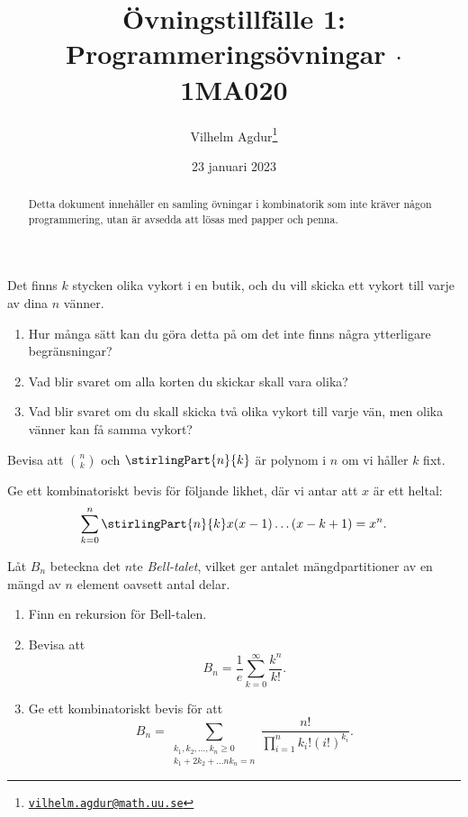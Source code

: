 \documentclass[nobib]{tufte-handout}
\title{Övningstillfälle 1: Programmeringsövningar $\cdot$ 1MA020}
\author[Vilhelm Agdur]{Vilhelm Agdur\thanks{\href{mailto:vilhelm.agdur@math.uu.se}{\nolinkurl{vilhelm.agdur@math.uu.se}}}}
\date{23 januari 2023}
\begin{document}
\maketitle%

\begin{abstract}
\noindent
Detta dokument innehåller en samling övningar i kombinatorik som inte kräver någon programmering, utan är avsedda att lösas med papper och penna.
\end{abstract}

\begin{xca}
    Det finns $k$ stycken olika vykort i en butik, och du vill skicka ett vykort till varje av dina $n$ vänner.

    \begin{enumerate}
        \item Hur många sätt kan du göra detta på om det inte finns några ytterligare begränsningar?
        \item Vad blir svaret om alla korten du skickar skall vara olika?
        \item Vad blir svaret om du skall skicka två olika vykort till varje vän, men olika vänner kan få samma vykort?
    \end{enumerate}
\end{xca}

\begin{xca}
    Bevisa att $\binom{n}{k}$ och $\stirlingPart{n}{k}$ är polynom i $n$ om vi håller $k$ fixt.
\end{xca}

\begin{xca}
    Ge ett kombinatoriskt bevis för följande likhet, där vi antar att $x$ är ett heltal:
    $$\sum_{k = 0}^{n} \stirlingPart{n}{k}x(x-1)\ldots(x-k+1) = x^n.$$
\end{xca}

\begin{xca}
    Låt $B_n$ beteckna det $n$te \emph{Bell-talet}, vilket ger antalet mängdpartitioner av en mängd av $n$ element oavsett antal delar.

    \begin{enumerate}[label = \roman*)]
        \item Finn en rekursion för Bell-talen.
        \item Bevisa att
        $$B_n = \frac{1}{e}\sum_{k = 0}^{\infty} \frac{k^n}{k!}.$$
        \item Ge ett kombinatoriskt bevis för att
        $$B_n = \sum_{\substack{k_1, k_2, \ldots, k_n \geq 0\\k_1 + 2k_2 + \ldots nk_n = n}} \frac{n!}{\prod_{i=1}^{n} k_i!(i!)^{k_i}}.$$
    \end{enumerate}
\end{xca}

%
%
\end{document}
